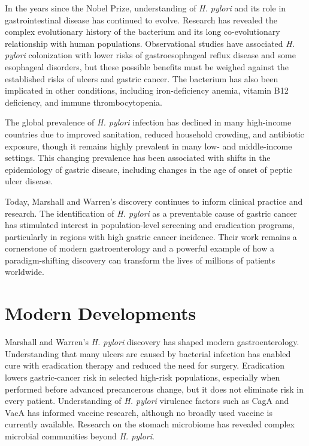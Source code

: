 In the years since the Nobel Prize, understanding of \textit{H. pylori} and its role in gastrointestinal disease has continued to evolve. Research has revealed the complex evolutionary history of the bacterium and its long co-evolutionary relationship with human populations. Observational studies have associated \textit{H. pylori} colonization with lower risks of gastroesophageal reflux disease and some esophageal disorders, but these possible benefits must be weighed against the established risks of ulcers and gastric cancer. The bacterium has also been implicated in other conditions, including iron-deficiency anemia, vitamin B12 deficiency, and immune thrombocytopenia.

The global prevalence of \textit{H. pylori} infection has declined in many high-income countries due to improved sanitation, reduced household crowding, and antibiotic exposure, though it remains highly prevalent in many low- and middle-income settings. This changing prevalence has been associated with shifts in the epidemiology of gastric disease, including changes in the age of onset of peptic ulcer disease.

Today, Marshall and Warren's discovery continues to inform clinical practice and research. The identification of \textit{H. pylori} as a preventable cause of gastric cancer has stimulated interest in population-level screening and eradication programs, particularly in regions with high gastric cancer incidence. Their work remains a cornerstone of modern gastroenterology and a powerful example of how a paradigm-shifting discovery can transform the lives of millions of patients worldwide.


\section{Modern Developments}

Marshall and Warren's \textit{H. pylori} discovery has shaped modern gastroenterology. Understanding that many ulcers are caused by bacterial infection has enabled cure with eradication therapy and reduced the need for surgery. Eradication lowers gastric-cancer risk in selected high-risk populations, especially when performed before advanced precancerous change, but it does not eliminate risk in every patient. Understanding of \textit{H. pylori} virulence factors such as CagA and VacA has informed vaccine research, although no broadly used vaccine is currently available. Research on the stomach microbiome has revealed complex microbial communities beyond \textit{H. pylori}.


